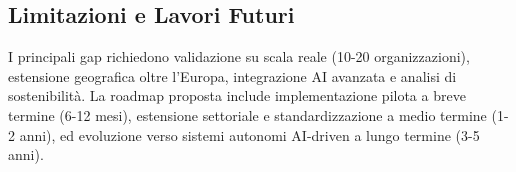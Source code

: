 \subsection{\texorpdfstring{\textbf{Limitazioni e Lavori Futuri}}{1.8.3 Limitazioni e Lavori Futuri}}\label{limitazioni-lavori-futuri}

I principali gap richiedono validazione su scala reale (10-20 organizzazioni), estensione geografica oltre l'Europa, integrazione AI avanzata e analisi di sostenibilità. La roadmap proposta include implementazione pilota a breve termine (6-12 mesi), estensione settoriale e standardizzazione a medio termine (1-2 anni), ed evoluzione verso sistemi autonomi AI-driven a lungo termine (3-5 anni).
\printbibliography[heading=subbibliography]








